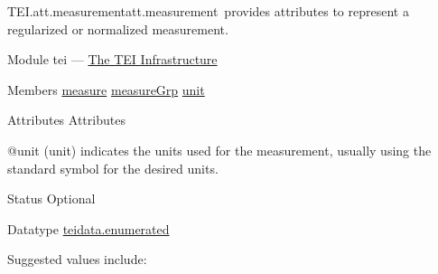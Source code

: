 \begin{reflist}
\item[]\begin{specHead}{TEI.att.measurement}{att.measurement} provides attributes to represent a regularized or normalized measurement.\end{specHead} 
    \item[{Module}]
  tei — \hyperref[ST]{The TEI Infrastructure}
    \item[{Members}]
  \hyperref[TEI.measure]{measure} \hyperref[TEI.measureGrp]{measureGrp} \hyperref[TEI.unit]{unit}
    \item[{Attributes}]
  Attributes\hfil\\[-10pt]\begin{sansreflist}
    \item[@unit]
  (unit) indicates the units used for the measurement, usually using the standard symbol for the desired units.
\begin{reflist}
    \item[{Status}]
  Optional
    \item[{Datatype}]
  \hyperref[TEI.teidata.enumerated]{teidata.enumerated}
    \item[{Suggested values include:}]
  \begin{description}


\end{description}
\end{reflist}
\end{sansreflist}
\end{reflist}
